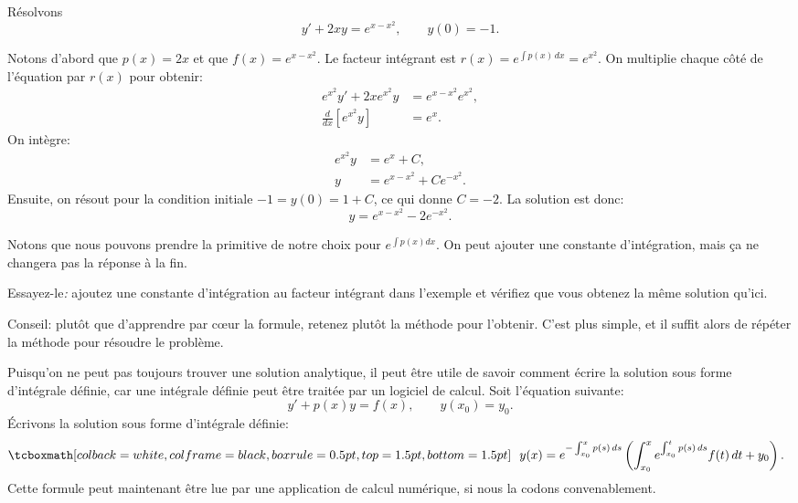 \begin{example}
	Résolvons
	\begin{equation*}
		y' + 2xy = e^{x-x^2}, \qquad y(0) = -1 .
	\end{equation*}

	Notons d'abord que $p(x) = 2x$ et que $f(x) = e^{x-x^2}$.
	Le facteur intégrant est $r(x) = e^{\int p(x)\, dx} = e^{x^2}$.
	On multiplie chaque côté de l'équation par $r(x)$ pour obtenir:
	\begin{align*}
		e^{x^2} y' + 2xe^{x^2}y & = e^{x-x^2} e^{x^2} , \\
		\frac{d}{dx} \left[ e^{x^2} y \right] &= e^x .
	\end{align*}
	On intègre:
	\begin{align*}
		e^{x^2} y &= e^x +C , \\
		y &= e^{x-x^2} + C e^{-x^2} .
	\end{align*}
	Ensuite, on résout pour la condition initiale $-1 = y(0) = 1 + C$, ce qui donne $C=-2$.
	La solution est donc:
	\begin{equation*}
		y = e^{x-x^2} - 2 e^{-x^2} .
	\end{equation*}
\end{example}
Notons que nous pouvons prendre la primitive de notre choix pour
$e^{\int p(x) dx}$.  On peut ajouter une constante d'intégration, mais ça ne changera pas la réponse à la fin.

\begin{exercise}
	Essayez-le\textit{:} ajoutez une constante d'intégration au facteur intégrant dans l'exemple et vérifiez que vous obtenez la même solution qu'ici.
\end{exercise}

Conseil: plutôt que d'apprendre par c{\oe}ur la formule, retenez plutôt la méthode pour l'obtenir.
C'est plus simple, et il suffit alors de répéter la méthode pour résoudre le problème.

Puisqu'on ne peut pas toujours trouver une solution analytique, il peut être utile de savoir comment écrire la solution sous forme d'intégrale définie, car une intégrale définie peut être traitée par un logiciel de calcul.  Soit l'équation suivante:
\begin{equation*}
	y' + p(x) y = f(x) , \qquad y(x_0) = y_0 .
\end{equation*}
Écrivons la solution sous forme d'intégrale définie:
\begin{equation} \label{lei:defsol}
\mybxbg{
~~
y(x) = e^{-\int_{x_0}^x p(s)\, ds} \left( \int_{x_0}^x e^{\int_{x_0}^t p(s)\, ds}
f(t) \,dt + y_0 \right).
~~
}
\end{equation}
Cette formule peut maintenant être lue par une application de calcul numérique,  si nous la codons convenablement.

